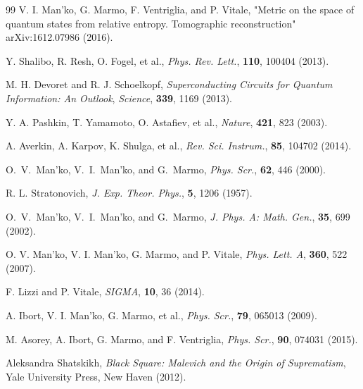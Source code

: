 \documentclass[12pt]{article}
\begin{document}
\begin{thebibliography}{99}
V. I. Man'ko, G. Marmo, F. Ventriglia, and P. Vitale, "Metric on the
space of quantum states from relative entropy. Tomographic
reconstruction" arXiv:1612.07986 (2016).

Y. Shalibo, R. Resh, O. Fogel, et al.,
{\sl Phys. Rev. Lett.}, {\bf 110}, 100404 (2013).

M. H. Devoret and R. J. Schoelkopf, {\it Superconducting Circuits
for Quantum Information: An Outlook}, {\sl Science}, {\bf 339}, 1169
(2013).

Y. A. Pashkin, T. Yamamoto, O. Astafiev, et al.,
{\sl Nature}, {\bf 421}, 823 (2003).

A. Averkin, A. Karpov, K. Shulga, et al.,
{\sl Rev. Sci. Instrum.}, {\bf 85}, 104702 (2014).

O.~V.~Man'ko, V.~I.~Man'ko, and G.~Marmo, {\sl Phys. Scr.}, {\bf
62}, 446 (2000).

R. L. Stratonovich, {\sl J. Exp. Theor. Phys.}, {\bf 5}, 1206
(1957).

O.~V.~Man'ko, V.~I.~Man'ko, and G.~Marmo, {\sl J. Phys. A: Math.
Gen.}, {\bf 35}, 699 (2002).

O. V. Man'ko, V. I. Man'ko, G. Marmo, and P. Vitale, {\sl Phys.
Lett. A}, {\bf 360}, 522 (2007).

F. Lizzi and P. Vitale, {\sl SIGMA}, %
{\bf 10}, 36 (2014).

A. Ibort, V. I. Man'ko, G. Marmo, et al., %
{\sl Phys. Scr.}, {\bf 79}, 065013 (2009).

M. Asorey, A. Ibort, G. Marmo, and F. Ventriglia, {\sl Phys. Scr.},
{\bf 90}, 074031  (2015).

Aleksandra Shatskikh, {\it Black Square: Malevich and the Origin of Suprematism},
Yale University Press, New Haven (2012).


\end{thebibliography}
\end{document}
